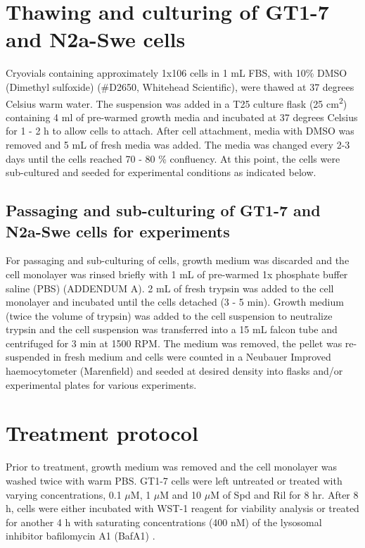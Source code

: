 \section{Thawing and culturing of GT1-7 and N2a-Swe cells}
Cryovials containing approximately 1x106 cells in 1 mL FBS, with 10\% DMSO (Dimethyl sulfoxide) (\#D2650, Whitehead Scientific), were thawed at 37 degrees Celsius warm water. The suspension was added in a T25 culture flask (25 cm\textsuperscript{2}) containing 4 ml of pre-warmed growth media and incubated at 37 degrees Celsius for 1 - 2 h to allow cells to attach. After cell attachment, media with DMSO was removed and 5 mL of fresh media was added. The media was changed every 2-3 days until the cells reached 70 - 80 \% confluency. At this point, the cells were sub-cultured and seeded for experimental conditions as indicated below.

\subsection{Passaging and sub-culturing of GT1-7 and N2a-Swe cells for experiments}
For passaging and sub-culturing of cells, growth medium was discarded and the cell monolayer was rinsed briefly with 1 mL of pre-warmed 1x phosphate buffer saline (PBS) (ADDENDUM A). 2 mL of fresh trypsin was added to the cell monolayer and incubated until the cells detached (3 - 5 min). Growth medium (twice the volume of trypsin) was added to the cell suspension to neutralize trypsin and the cell suspension was transferred into a 15 mL falcon tube and centrifuged for 3 min at 1500 RPM. The medium was removed, the pellet was re-suspended in fresh medium and cells were counted in a Neubauer Improved haemocytometer (Marenfield) and seeded at desired density into flasks and/or experimental plates for various experiments.

\section{Treatment protocol}
Prior to treatment, growth medium was removed and the cell monolayer was washed twice with warm PBS. GT1-7 cells were left untreated or treated with varying concentrations, 0.1 $\mu$M, 1 $\mu$M and 10 $\mu$M of Spd and Ril for 8 hr. After 8 h, cells were either incubated with WST-1 reagent for viability analysis or treated for another 4 h with saturating concentrations (400 nM) of the lysosomal inhibitor bafilomycin A1 (BafA1) \citep{DuToit2018b,loos2014}.

